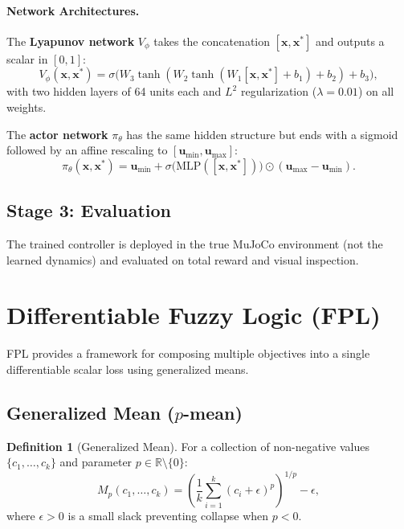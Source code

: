 \documentclass[11pt]{article}
\newcommand{\R}{\mathbb{R}}
\newcommand{\pmean}[2]{M_{#1}\!\left(#2\right)}
\newcommand{\x}{\bm{x}}
\newcommand{\xstar}{\bm{x}^*}
\newcommand{\uu}{\bm{u}}
\theoremstyle{definition}
\newtheorem{definition}{Definition}
\begin{document}
\paragraph{Network Architectures.}

The \textbf{Lyapunov network} $V_\phi$ takes the concatenation $[\x, \xstar]$
and outputs a scalar in $[0,1]$:
\[
    V_\phi(\x, \xstar) = \sigma\!\bigl(W_3 \tanh(W_2 \tanh(W_1 [\x, \xstar] + b_1) + b_2) + b_3\bigr),
\]
with two hidden layers of 64 units each and $L^2$ regularization ($\lambda = 0.01$)
on all weights.

The \textbf{actor network} $\pi_\theta$ has the same hidden structure but ends
with a sigmoid followed by an affine rescaling to $[\uu_{\min}, \uu_{\max}]$:
\[
    \pi_\theta(\x, \xstar) = \uu_{\min} + \sigma\!\bigl(\text{MLP}([\x, \xstar])\bigr)
      \odot (\uu_{\max} - \uu_{\min}).
\]

\subsection{Stage 3: Evaluation}

The trained controller is deployed in the true MuJoCo environment (not the
learned dynamics) and evaluated on total reward and visual inspection.

\section{Differentiable Fuzzy Logic (FPL)}\label{sec:fpl}

FPL provides a framework for composing multiple objectives into a single
differentiable scalar loss using generalized means.

\subsection{Generalized Mean ($p$-mean)}

\begin{definition}[Generalized Mean]
For a collection of non-negative values $\{c_1, \dots, c_k\}$ and parameter
$p \in \R \setminus \{0\}$:
\begin{equation}\label{eq:pmean}
    \pmean{p}{c_1, \dots, c_k}
    = \left(\frac{1}{k} \sum_{i=1}^{k} (c_i + \epsilon)^p\right)^{1/p} - \epsilon,
\end{equation}
where $\epsilon > 0$ is a small slack preventing collapse when $p < 0$.
\end{definition}
\end{document}
